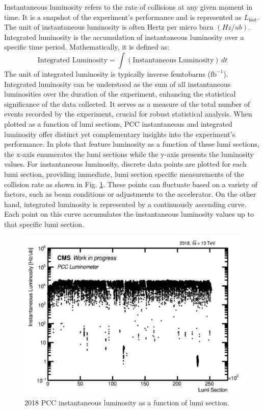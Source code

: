 Instantaneous luminosity refers to the rate of collisions at any given moment in time. It is a snapshot of the experiment's performance and is represented as \( L_{\text{inst}} \). The unit of instantaneous luminosity is often Hertz per micro barn $(Hz/ub)$. Integrated luminosity is the accumulation of instantaneous luminosity over a specific time period. Mathematically, it is defined as:
\[
\text{Integrated Luminosity} = \int (\text{Instantaneous Luminosity}) \, dt
\]
The unit of integrated luminosity is typically inverse femtobarns (\( \text{fb}^{-1} \)). Integrated luminosity can be understood as the sum of all instantaneous luminosities over the duration of the experiment, enhancing the statistical significance of the data collected. It serves as a measure of the total number of events recorded by the experiment, crucial for robust statistical analysis. When plotted as a function of lumi sections, PCC instantaneous and integrated luminosity offer distinct yet complementary insights into the experiment's performance. In plots that feature luminosity as a function of these lumi sections, the x-axis enumerates the lumi sections while the y-axis presents the luminosity values.  For instantaneous luminosity, discrete data points are plotted for each lumi section, providing immediate, lumi section specific measurements of the collision rate as shown in Fig. \ref{fig:PCC_inst_2018}. These points can fluctuate based on a variety of factors, such as beam conditions or adjustments to the accelerator. On the other hand, integrated luminosity is represented by a continuously ascending curve. Each point on this curve accumulates the instantaneous luminosity values up to that specific lumi section. %


\begin{figure}[!htp]
\centering
\includegraphics[width=1\textwidth]{ashish_thesis/PCClumivslumisection_2018_1.png}
\caption[2018 PCC Inst. Luminosity]{%
 2018 PCC instantaneous luminosity as a function of lumi section.
}
\label{fig:PCC_inst_2018}
\end{figure}


